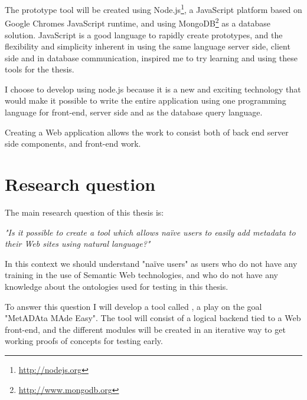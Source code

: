 The prototype tool will be created using Node.js\footnote{\url{http://nodejs.org}},
a JavaScript platform based on Google Chromes JavaScript runtime,
and using MongoDB\footnote{\url{http://www.mongodb.org}} as a database solution.
JavaScript is a good language to rapidly create prototypes, and the flexibility and simplicity inherent in using the same language
server side, client side and in database communication, inspired me to try learning and using these tools for the thesis.

%

I choose to develop using node.js because it is a new and exciting technology that would make it possible to write
the entire application using one programming language for front-end, server side and as the database query language.

Creating a Web application allows the work to consist both of back end server side components, and front-end work.


\section{Research question}
The main research question of this thesis is:

\emph{"Is it possible to create a tool which allows naïve users to easily add metadata to their Web sites using natural language?"}

In this context we should understand "naïve users" as users who do not have any training in the use of Semantic Web technologies,
and who do not have any knowledge about the ontologies used for testing in this thesis.

To answer this question I will develop a tool called \theartefact, a play on the goal "MetADAta MAde Easy".
The tool will consist of a logical backend tied to a Web front-end,
and the different modules will be created in an iterative way to get working proofs of concepts for testing early.

